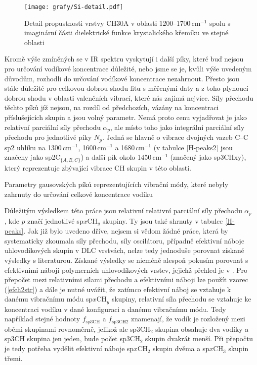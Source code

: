 \begin{figure}[tb]
	\texttt{[image: grafy/Si-detail.pdf]}
	\caption{Detail propustnosti vrstvy CH30A v oblasti 1200--1700\,cm$^{-1}$ spolu s ima\-gi\-nární části dielektrické funkce krystalického křemíku ve stejné oblasti}
	\label{Si-detail}
\end{figure}

Kromě výše zmíněných se v IR spektru vyskytují i další píky, které buď nejsou pro určování vodíkové koncentrace důležité, nebo jsme se je, kvůli výše uvedeným důvodům, rozhodli do určování vodíkové koncentrace nezahrnout. Přesto jsou stále důležité pro celkovou dobrou shodu fitu s měřenými daty a z toho plynoucí dobrou shodu v oblasti valenčních vibrací, které nás zajímá nejvíce. Síly přechodu těchto píků jíž nejsou, na rozdíl od předchozích, vázány na koncentraci příslušejících skupin a jsou volný parametr. 
Nemá proto cenu vyjadřovat je jako relativní parciální síly přechodu $\alpha_p$, ale místo toho jako integrální parciální síly přechodu pro jednotlivé píky $N_p$. Jedná se hlavně o vibrace dvojných vazeb C--C sp2 uhlíku na 1300\,cm$^{-1}$, 1600\,cm$^{-1}$ a 1680\,cm$^{-1}$ \cite{Robertson2002, Theye2001, Zajickova2011} (v tabulce \ref{H-peaks2} jsou značeny jako sp2C$_{\{A,B,C\}}$) a další pík okolo 1450\,cm$^{-1}$ (značený jako sp3CHxy), který reprezentuje zbývající vibrace CH skupin v této oblasti.

\begin{table}[tbp]
 \centering
	\renewcommand{\tabcolsep}{1pt}
 
 \caption{Parametry gausovských píků reprezentujících vibrační módy, které nebyly zahrnuty do určování celkové koncentrace vodíku}
\label{H-peaks2}
\end{table}

Důležitým výsledkem této práce jsou relativní relativní parciální síly přechodu $\alpha_p$, kde $p$ značí jednotlivé sp$x$CH$_y$ skupiny. Ty jsou také shrnuty v tabulce \ref{H-peaks}. Jak již bylo uvedeno dříve, nejsem si vědom žádné práce, která by systematicky zkoumala síly přechodu, síly oscilátoru, případně efektivní náboje uhlovodíkových skupin v DLC vrstvách, nelze tedy jednoduše porovnat získané výsledky s literaturou. 
Získané výsledky se nicméně alespoň pokusím porovnat s efektivními náboji polymerních uhlovodíkových vrstev, jejichž přehled je v \cite{Heitz1998}. Pro přepočet mezi relativními silami přechodu a efektivními náboji lze použít vzorec (\ref{efch2str}) a dále je nutné uvážit, že zatímco efektivní náboj se vztahuje k danému vibračnímu módu sp$x$CH$_y$ skupiny, relativní síla přechodu se vztahuje ke koncentraci vodíku v dané konfiguraci a danému vibračnímu módu. 
Tedy například stejné hodnoty $f_\mathrm{sp3CH}$ a $f_\mathrm{sp3CH2}$ znamenají, že vodík je rozložený mezi oběmi skupinami rovnoměrně, jelikož ale sp3CH$_2$ skupina obsahuje dva vodíky a sp3CH skupina jen jeden, bude počet sp3CH$_2$ skupin dvakrát menší. Při přepočtu je tedy potřeba vydělit efektivní náboje sp$x$CH$_2$ skupin dvěma a sp$x$CH$_3$ skupin třemi. 

